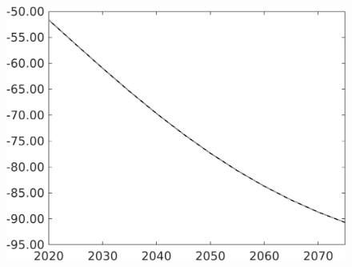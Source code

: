 \documentclass[12pt]{article}
\begin{document}
\begin{figure}[h!!]
\begin{minipage}[]{0.32\textwidth}
\end{minipage}
\begin{minipage}[]{0.32\textwidth}
\includegraphics[width=1\textwidth]{../../codding_model/own_basedOnFried/optimalPol_010922_revision/figures/all_13Sept22/PerdifNoTauf_Equlab_regime0_CompTaul_Lf_spillover0_nsk0_xgr1_knspil1_sep1_LFlimit0_emsbase0_countec0_GovRev0_etaa0.79_lgd0.png}
\end{minipage}			
\end{figure}
\end{document}
